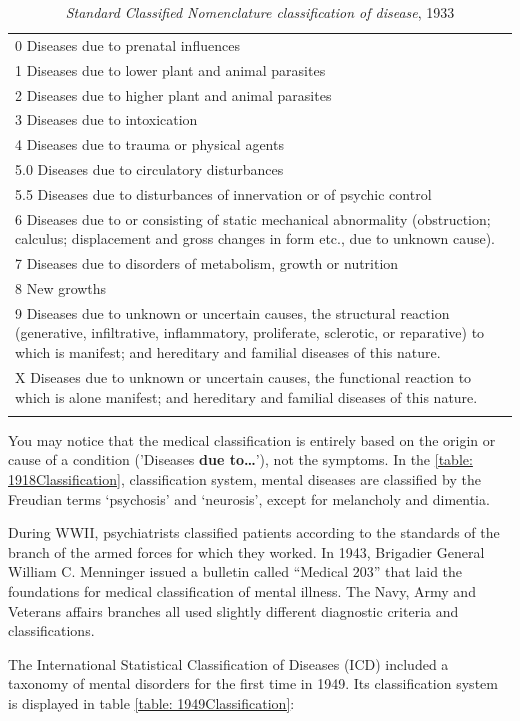 \begin{refsection}
 \begin{longtable}[!t]{ | p{13.8cm}  | }
\hline
0 Diseases due to prenatal influences\\
1 Diseases due to lower plant and animal parasites\\
2 Diseases due to higher plant and animal parasites\\
3 Diseases due to intoxication\\
4 Diseases due to trauma or physical agents\\
5.0 Diseases due to circulatory disturbances\\
5.5 Diseases due to disturbances of innervation or of psychic control\\
6 Diseases due to or consisting of static mechanical abnormality (obstruction; calculus; displacement and gross changes in form etc., due to unknown cause).\\
7 Diseases due to disorders of metabolism, growth or nutrition\\
8 New growths\\
9 Diseases due to unknown or uncertain causes, the structural reaction (generative, infiltrative, inflammatory, proliferate, sclerotic, or reparative) to which is manifest; and hereditary and familial diseases of this nature.\\
X Diseases due to unknown or uncertain causes, the functional reaction to which is alone manifest; and hereditary and familial diseases of this nature.\\ \hline
\caption{\emph{Standard Classified Nomenclature classification of disease}, 1933}
\label{table: 1933Classification}
\end{longtable}


You may notice that the medical classification is entirely based on the origin or cause of a condition ('Diseases \textbf{due to{\ldots}}’), not the symptoms. In the \ref{table: 1918Classification}, classification system, mental diseases are classified by the Freudian terms `psychosis' and `neurosis', except for melancholy and dimentia.

During WWII, psychiatrists classified patients according to the standards of the branch of the armed forces for which they worked. In 1943, Brigadier General William C. Menninger issued a bulletin called “Medical 203” that laid the foundations for medical classification of mental illness. The Navy, Army and Veterans affairs branches all used slightly different diagnostic criteria and classifications.

The International Statistical Classification of Diseases (ICD) included a taxonomy of mental disorders for the first time in 1949. Its classification system is displayed in table \ref{table: 1949Classification}:


\end{refsection}
